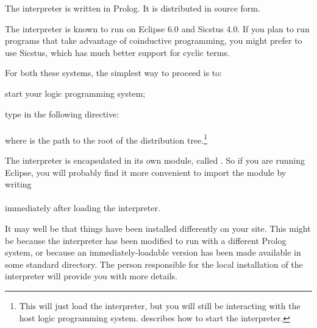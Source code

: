 


The interpreter is written in Prolog.  It is distributed in source
form.%

The interpreter is known to run on Eclipse 6.0 and Sicstus 4.0.  If you plan
to run programs that take advantage of coinductive programming, you might
prefer to use Sicstus, which has much better support for cyclic terms.

For both these systems, the simplest way to proceed is to:
\begin{Enumerate}
\item
  start your logic programming system;
\item
  type in the following directive:\\
  \ind{}\\
  where  is the path to the root of the distribution
  tree.\footnote{
    This will just load the interpreter, but you will still be interacting
    with the host logic programming system.  
    describes how to start the interpreter.}
\end{Enumerate}

The interpreter is encapsulated in its own module, called .  So if
you are running Eclipse, you will probably find it more convenient to import
the module by writing\\
\ind{}\label{import-dra}\\
immediately after loading the interpreter.

It may well be that things have been installed differently on your site.
This might be because the interpreter has been modified to run with a
different Prolog system, or because an immediately-loadable version has been
made available in some standard directory. The person responsible for the
local installation of the interpreter will provide you with more details.



